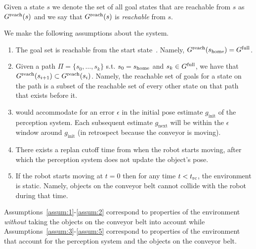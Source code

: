 \documentclass[conference]{IEEEtran}
\begin{document}
Given a state $s$ we denote the set of all goal states that are reachable from $s$ as $G^{\rm reach}(s)$ and we say that $G^{\rm reach}(s)$ is \emph{reachable} from $s$.


We make the following assumptions about the system.
\begin{enumerate}[label={\textbf{A\arabic*}},leftmargin=0.75cm]
    \item \label{assum:1} The goal set \Gfull is reachable from the start state~\Shome. Namely,  $G^{\rm reach}(s_{\textrm{home}}) = G^{\textrm{full}}$.
    
    \item \label{assum:2} Given a path 
    $\Pi = \{s_0, \ldots, s_k \}$ 
    s.t. $s_0 = s_{\textrm{home}}$ and $s_k \in G^{\textrm{full}}$, 
    we have that $G^{\rm reach}(s_{i+1}) \subset G^{\rm reach}(s_{i})$.
    Namely, the reachable set of goals for a state on the path is a subset of the reachable set of every other state on that path that exists before it.
    
    \item \label{assum:3} \Gfull would accommodate for an error $\epsilon$ in the initial pose estimate $g_{\textrm{init}}$ of the perception system. Each subsequent estimate $g_{\textrm{next}}$ will be within the $\epsilon$ window around $g_{\textrm{init}}$ (in retrospect because the conveyor is moving).
    
    \item \label{assum:4} There exists a replan cutoff time \Trc from when the robot starts moving, after which the perception system does not update the object's pose.
    
    \item \label{assum:5} If the robot starts moving at $t = 0$ then for any time $t < t_{\textrm{rc}}$, the environment is static. Namely, objects on the conveyor belt cannot collide with the robot during that time.
\end{enumerate}

Assumptions~\ref{assum:1}-\ref{assum:2} correspond to properties of the environment \emph{without} taking the objects on the conveyor belt into account 
while
Assumptions~\ref{assum:3}-\ref{assum:5} correspond to properties of the environment that account for the perception system and the objects on the conveyor belt.
\end{document}
